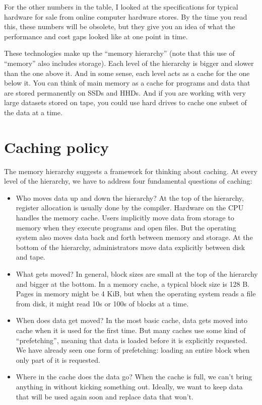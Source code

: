 \documentclass[12pt]{book}
\begin{document}
For the other numbers in the table, I looked at the specifications for
typical hardware for sale from online computer hardware stores.  By
the time you read this, these numbers will be obsolete, but they give
you an idea of what the performance and cost gaps looked like at one
point in time.

These technologies make up the ``memory hierarchy'' (note that this
use of ``memory'' also includes storage).  Each
level of the hierarchy is bigger and slower than the one above it.
And in some sense, each level acts as a cache for the one below
it.  You can think of main memory as a cache for programs and data
that are stored permanently on SSDs and HHDs.  And if you are working
with very large datasets stored on tape, you could use hard drives
to cache one subset of the data at a time.


\section{Caching policy}

The memory hierarchy suggests a framework for thinking about
caching.  At every level of the hierarchy, we have to address
four fundamental questions of caching:

\begin{itemize}

\item Who moves data up and down the hierarchy?  At the top of the
  hierarchy, register allocation is usually done by the compiler.
  Hardware on the CPU handles the memory cache.  Users implicitly move
  data from storage to memory when they execute programs and open
  files.  But the operating system also moves data back and forth
  between memory and storage.  At the bottom of the hierarchy,
  administrators move data explicitly between disk and tape.

\item What gets moved?  In general, block sizes are small at the top
  of the hierarchy and bigger at the bottom.  In a memory cache, a
  typical block size is 128 B.  Pages in memory might be 4 KiB, but
  when the operating system reads a file from disk, it might read 10s
  or 100s of blocks at a time.

\item When does data get moved?  In the most basic cache, data gets
  moved into cache when it is used for the first time.  But many
  caches use some kind of ``prefetching'', meaning that data is
  loaded before it is explicitly requested.  We have already seen
  one form of prefetching: loading an entire block when only part of
  it is requested.

\item Where in the cache does the data go?  When the cache is full, we
  can't bring anything in without kicking something out.  Ideally,
  we want to keep data that will be used again soon and replace data
  that won't.

\end{itemize}
\end{document}
